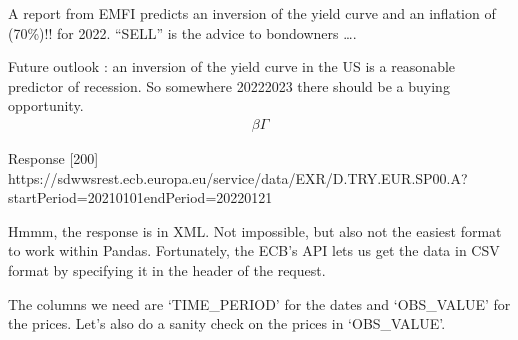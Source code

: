 \documentclass[letterpaper,10pt,english]{sphinxmanual}
\begin{document}
\sphinxAtStartPar
A report from EMFI predicts an inversion of the yield curve and an
inflation of (70\%)!! for 2022. “SELL” is the advice to bondowners ….

\sphinxAtStartPar
Future outlook : an inversion of the yield curve in the US is a
reasonable predictor of recession. So somewhere 2022\sphinxhyphen{}2023 there should
be a buying opportunity.
\begin{equation*}
\begin{split}\beta\Gamma\end{split}
\end{equation*}
\begin{sphinxVerbatim}[commandchars=\\\{\}]
\end{sphinxVerbatim}

\begin{sphinxVerbatim}[commandchars=\\\{\}]
\PYGZlt{}Response [200]\PYGZgt{}
https://sdw\PYGZhy{}wsrest.ecb.europa.eu/service/data/EXR/D.TRY.EUR.SP00.A?startPeriod=2021\PYGZhy{}01\PYGZhy{}01\PYGZam{}endPeriod=2022\PYGZhy{}01\PYGZhy{}21
\end{sphinxVerbatim}

\sphinxAtStartPar
Hmmm, the response is in XML. Not impossible, but also not the easiest
format to work within Pandas. Fortunately, the ECB’s API lets us get the
data in CSV format by specifying it in the header of the request.

\begin{sphinxVerbatim}[commandchars=\\\{\}]
 \PYG{p}{[}\PYG{p}{]}
\end{sphinxVerbatim}

\sphinxAtStartPar
The columns we need are ‘TIME\_PERIOD’ for the dates and ‘OBS\_VALUE’ for
the prices. Let’s also do a sanity check on the prices in ‘OBS\_VALUE’.

\begin{sphinxVerbatim}[commandchars=\\\{\}]
    
      
        
        
        
       
       
       
   
\end{sphinxVerbatim}
\end{document}
